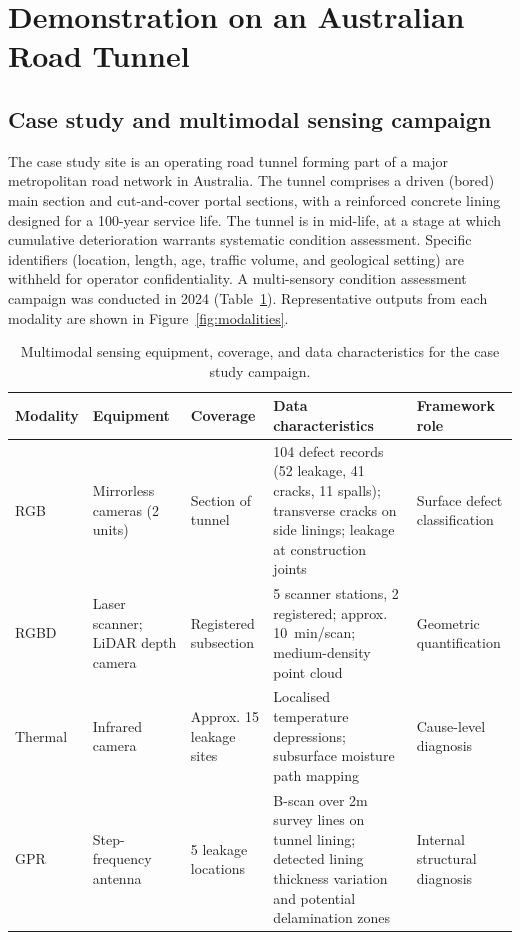 \documentclass[11pt,a4paper]{article}
\begin{document}
\section{Demonstration on an Australian Road Tunnel}
\label{sec:demo}

\subsection{Case study and multimodal sensing campaign}
\label{sec:tunnelA}

The case study site is an operating road tunnel forming part of a major metropolitan road network in Australia. The tunnel comprises a driven (bored) main section and cut-and-cover portal sections, with a reinforced concrete lining designed for a 100-year service life. The tunnel is in mid-life, at a stage at which cumulative deterioration warrants systematic condition assessment. Specific identifiers (location, length, age, traffic volume, and geological setting) are withheld for operator confidentiality. A multi-sensory condition assessment campaign was conducted in 2024 (Table~\ref{tab:data_collection}). Representative outputs from each modality are shown in Figure~\ref{fig:modalities}.

\begin{table}[htbp]
\centering
\caption{Multimodal sensing equipment, coverage, and data
  characteristics for the case study campaign.}
\label{tab:data_collection}
\begin{tabularx}{\textwidth}{p{1.7cm} p{2.5cm} p{1.7cm} X p{2.0cm}}
\toprule
\textbf{Modality} & \textbf{Equipment} & \textbf{Coverage} &
  \textbf{Data characteristics} & \textbf{Framework role} \\
\midrule
RGB & Mirrorless cameras (2 units) & Section of tunnel &
  104 defect records (52 leakage, 41 cracks, 11 spalls);
  transverse cracks on side linings; leakage at construction joints &
  Surface defect classification \\[3pt]
RGBD & Laser scanner; LiDAR depth camera &
  Registered subsection & 5 scanner stations, 2 registered;
  approx. 10~min/scan; medium-density point cloud &
  Geometric quantification \\[3pt]
Thermal & Infrared camera & Approx. 15 leakage sites &
  Localised temperature depressions; subsurface moisture path mapping &
  Cause-level diagnosis \\[3pt]
GPR & Step-frequency antenna & 5 leakage locations &
  B-scan over 2m survey lines on tunnel lining; detected lining thickness variation and potential delamination zones &
  Internal structural diagnosis \\
\bottomrule
\end{tabularx}
\end{table}
\end{document}
